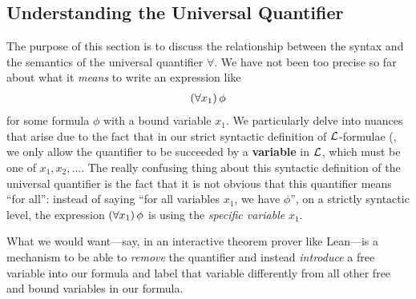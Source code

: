 \subsection{Understanding the Universal Quantifier}

The purpose of this section is to discuss the relationship between the syntax and the semantics of the universal quantifier $\forall$. We have not been too precise so far about what it \textit{means} to write an expression like
\begin{align*}
    \left( \forall x_1 \right)\phi
\end{align*}
for some formula $\phi$ with a bound variable $x_1$. We particularly delve into nuances that arise due to the fact that in our strict syntactic definition of $\mathcal{L}$-formulae (, we only allow the quantifier to be succeeded by a \textbf{variable} in $\mathcal{L}$, which must be one of $x_1, x_2, \ldots$. The really confusing thing about this syntactic definition of the universal quantifier is the fact that it is not obvious that this quantifier means ``for all'': instead of saying ``for all variables $x_1$, we have $\phi$'', on a strictly syntactic level, the expression $\left( \forall x_1 \right)\phi$ is using the \textit{specific variable} $x_1$.

What we would want---say, in an interactive theorem prover like Lean---is a mechanism to be able to \textit{remove} the quantifier and instead \textit{introduce} a free variable into our formula and label that variable differently from all other free and bound variables in our formula.

